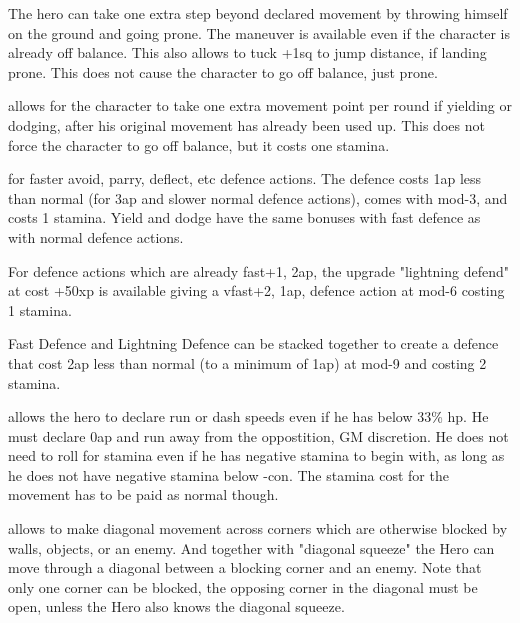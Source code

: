 

The hero can take one extra step beyond declared movement by throwing himself on the ground and going prone. The maneuver is available even if the character is already off balance. This also allows to tuck +1sq to jump distance, if landing prone. This does not cause the character to go off balance, just prone.


 allows for the character to take one extra movement point per round if yielding or dodging, after his original movement has already been used up. This does not force the character to go off balance, but it costs one stamina.


 for faster avoid, parry, deflect, etc defence actions. The defence costs 1ap less than normal (for 3ap and slower normal defence actions), comes with mod-3, and costs 1 stamina. Yield and dodge have the same bonuses with fast defence as with normal defence actions.

For defence actions which are already fast+1, 2ap, the upgrade "lightning defend" at cost +50xp is available giving a vfast+2, 1ap, defence action at mod-6 costing 1 stamina.

Fast Defence and Lightning Defence can be stacked together to create a defence that cost 2ap less than normal (to a minimum of 1ap) at mod-9 and costing 2 stamina.


 allows the hero to declare run or dash speeds even if he has below 33\% hp. He must declare 0ap and run away from the oppostition, GM discretion. He does not need to roll for stamina even if he has negative stamina to begin with, as long as he does not have negative stamina below -con. The stamina cost for the movement has to be paid as normal though.


 allows to make diagonal movement across corners which are otherwise blocked by walls, objects, or an enemy. And together with "diagonal squeeze" the Hero can move through a diagonal between a blocking corner and an enemy. Note that only one corner can be blocked, the opposing corner in the diagonal must be open, unless the Hero also knows the diagonal squeeze.



